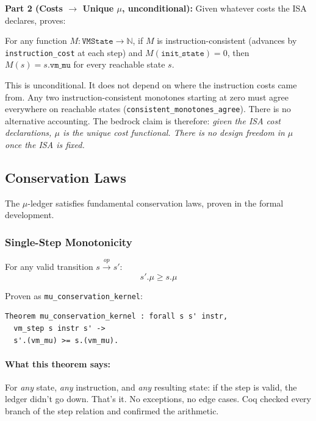 \textbf{Part 2 (Costs $\to$ Unique $\mu$, unconditional):} Given whatever costs the ISA declares,  proves:

\begin{theorem}
For any function $M : \texttt{VMState} \to \mathbb{N}$, if $M$ is instruction-consistent (advances by \texttt{instruction\_cost} at each step) and $M(\texttt{init\_state}) = 0$, then $M(s) = s.\texttt{vm\_mu}$ for every reachable state $s$.
\end{theorem}

This is unconditional. It does not depend on where the instruction costs came from. Any two instruction-consistent monotones starting at zero must agree everywhere on reachable states (\texttt{consistent\_monotones\_agree}). There is no alternative accounting. The bedrock claim is therefore: \emph{given the ISA cost declarations, $\mu$ is the unique cost functional. There is no design freedom in $\mu$ once the ISA is fixed.}

\subsection{Conservation Laws}

The $\mu$-ledger satisfies fundamental conservation laws, proven in the formal development.

\subsubsection{Single-Step Monotonicity}

\begin{theorem}[$\mu$-Monotonicity]
For any valid transition $s \xrightarrow{op} s'$:
\[
s'.\mu \ge s.\mu
\]
\end{theorem}

Proven as \texttt{mu\_conservation\_kernel}:
\begin{lstlisting}
Theorem mu_conservation_kernel : forall s s' instr,
  vm_step s instr s' ->
  s'.(vm_mu) >= s.(vm_mu).
\end{lstlisting}

\paragraph{What this theorem says:} For \emph{any} state, \emph{any} instruction, and \emph{any} resulting state: if the step is valid, the ledger didn't go down. That's it. No exceptions, no edge cases. Coq checked every branch of the step relation and confirmed the arithmetic.

